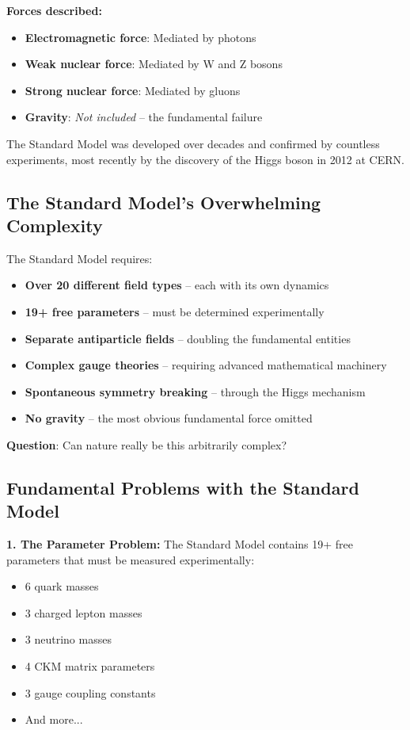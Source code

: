 \documentclass[12pt,a4paper]{article}
\theoremstyle{definition}
\theoremstyle{remark}
\begin{document}
	\textbf{Forces described:}
	\begin{itemize}
		\item \textbf{Electromagnetic force}: Mediated by photons
		\item \textbf{Weak nuclear force}: Mediated by W and Z bosons
		\item \textbf{Strong nuclear force}: Mediated by gluons
		\item \textbf{Gravity}: \emph{Not included} -- the fundamental failure
	\end{itemize}
	
	The Standard Model was developed over decades and confirmed by countless experiments, most recently by the discovery of the Higgs boson in 2012 at CERN.
	
	\subsection{The Standard Model's Overwhelming Complexity}
	
	\begin{tcolorbox}[colback=red!5!white,colframe=red!75!black,title=Standard Model Complexity Crisis]
		The Standard Model requires:
		\begin{itemize}
			\item \textbf{Over 20 different field types} -- each with its own dynamics
			\item \textbf{19+ free parameters} -- must be determined experimentally
			\item \textbf{Separate antiparticle fields} -- doubling the fundamental entities
			\item \textbf{Complex gauge theories} -- requiring advanced mathematical machinery
			\item \textbf{Spontaneous symmetry breaking} -- through the Higgs mechanism
			\item \textbf{No gravity} -- the most obvious fundamental force omitted
		\end{itemize}
		
		\textbf{Question}: Can nature really be this arbitrarily complex?
	\end{tcolorbox}
	
	\subsection{Fundamental Problems with the Standard Model}
	
	\textbf{1. The Parameter Problem:}
	The Standard Model contains 19+ free parameters that must be measured experimentally:
	\begin{itemize}
		\item 6 quark masses
		\item 3 charged lepton masses  
		\item 3 neutrino masses
		\item 4 CKM matrix parameters
		\item 3 gauge coupling constants
		\item And more...
	\end{itemize}
	
\end{document}
